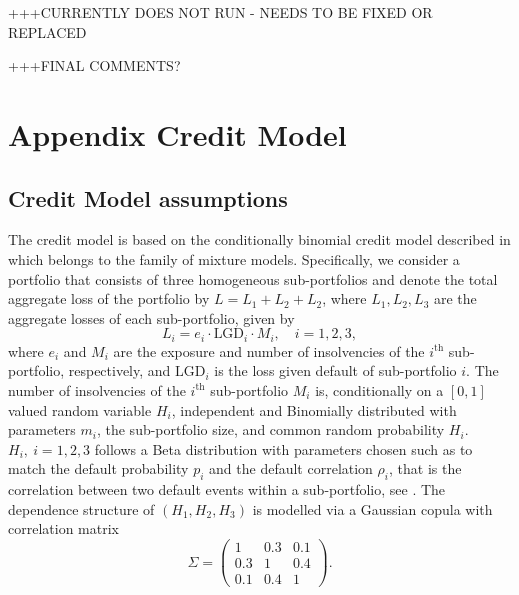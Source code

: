 \documentclass[]{article}
\begin{document}
+++CURRENTLY DOES NOT RUN - NEEDS TO BE FIXED OR REPLACED

+++FINAL COMMENTS?

\hypertarget{appendix-appendix}{%
\appendix}


\hypertarget{AppendixCM}{%
\section{Appendix Credit Model}\label{AppendixCM}}

\hypertarget{credit-model-assumptions}{%
\subsection{Credit Model assumptions}\label{credit-model-assumptions}}

The credit model is based on the conditionally binomial credit model described in \citet{Mcneil2015B} which belongs to the family of mixture models. Specifically, we consider a portfolio that consists of three homogeneous sub-portfolios and denote the total aggregate loss of the portfolio by \(L = L_1 + L_2+ L_2\), where \(L_1, L_2, L_3\) are the aggregate losses of each sub-portfolio, given by
\begin{equation}
L_i=e_i\cdot\text{LGD}_i\cdot M_i,\quad i=1,2,3, 
\end{equation}
where \(e_i\) and \(M_i\) are the exposure and number of insolvencies of the \(i^{\text{th}}\) sub-portfolio, respectively, and \(\text{LGD}_i\) is the loss given default of sub-portfolio \(i\). The number of insolvencies of the \(i^{\text{th}}\) sub-portfolio \(M_i\) is, conditionally on a \([0,1]\) valued random variable \(H_i\), independent and Binomially distributed with parameters \(m_i\), the sub-portfolio size, and common random probability \(H_i\). \(H_i, ~ i = 1,2,3\) follows a Beta distribution with parameters chosen such as to match the default probability \(p_i\) and the default correlation \(\rho_i\), that is the correlation between two default events within a sub-portfolio, see \citet{Mcneil2015B}. The dependence structure of \((H_1,H_2,H_3)\) is modelled via a Gaussian copula with correlation matrix\\
\begin{equation}\Sigma = \begin{pmatrix}
1 & 0.3 & 0.1\\
0.3 & 1 & 0.4\\
0.1 & 0.4 & 1
\end{pmatrix}.\end{equation}
\end{document}
